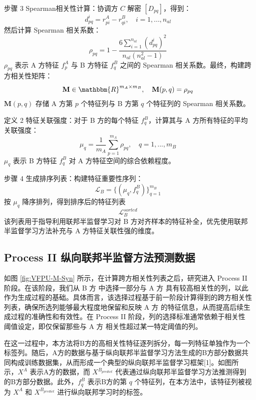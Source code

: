 步骤 3 Spearman相关性计算：协调方 $ C $ 解密 $ [D_{pq}] $，得到：
\begin{equation}
	d_{pq}^i = r^A_{pi} - r^B_{qi}, \quad i = 1, ..., n_{al}
\end{equation}
然后计算 Spearman 相关系数：
\begin{equation}
	\rho_{pq} = 1 - \frac{6\sum_{i=1}^{n_{al}} (d_{pq}^i)^2}{n_{al}(n_{al}^2 - 1)}
\end{equation}
$ \rho_{pq} $ 表示 A 方特征 $ f^A_p $ 与 B 方特征 $ f^B_q $ 之间的 Spearman 相关系数。最终，构建跨方相关性矩阵：
\begin{equation}
	\mathbf{M} \in \mathbbm{R}^{m_A \times m_B}, \quad \mathbf{M}(p,q) = \rho_{pq}
\end{equation}
$ \mathbf{M}(p,q) $ 存储 A 方第 $ p $ 个特征列与 B 方第 $ q $ 个特征列的 Spearman 相关系数。

定义 2 特征关联强度：对于 B 方的每个特征 $ f^B_q $，计算其与 A 方所有特征的平均关联强度：
\begin{equation}
	\mu_q = \frac{1}{m_A} \sum_{p=1}^{m_A} \rho_{pq}, \quad q=1,...,m_B
\end{equation}
$ \mu_q $ 表示 B 方特征 $ f^B_q $ 对 A 方特征空间的综合依赖程度。

步骤 4 生成排序列表：构建特征重要性序列：
\begin{equation}
	\mathcal{L}_B = \{(\mu_q, f^B_q)\}_{q=1}^{m_B}
\end{equation}
按 $ \mu_q $ 降序排列，得到排序后的特征列表
\begin{equation}
	\mathcal{L}_B^{sorted}
\end{equation}
该列表用于指导利用联邦半监督学习对 B 方对齐样本的特征补全，优先使用联邦半监督学习方法补充与 A 方特征关联性强的维度。
\subsection{Process II 纵向联邦半监督方法预测数据}
如图 \ref{fig:VFPU-M-Syn} 所示，在计算跨方相关性列表之后，研究进入 Process II 阶段。在该阶段，我们从 B 方 中选择一部分与 A 方 具有较高相关性的列，以此作为生成过程的基础。具体而言，该选择过程基于前一阶段计算得到的跨方相关性列表，确保所选列能够最大程度地保留和反映 A 方 的特征信息，从而提高后续生成过程的准确性和有效性。在 Process II 阶段，列的选择标准通常依赖于相关性阈值设定，即仅保留那些与 A 方 相关性超过某一特定阈值的列。

在这一过程中，本方法将B方的高相关性特征逐列拆分，每一列特征单独作为一个标签列。随后，A方的数据与基于纵向联邦半监督学习方法生成的B方部分数据共同构成训练数据集，从而形成一个典型的纵向联邦半监督学习框架[1]。如图所示，$X^A$ 表示A方的数据，而 ${{X}^{{{B}_{predict}}}}$ 代表通过纵向联邦半监督学习方法推测得到的B方部分数据。此外，$f_{q}^{B}$ 表示B方的第 $q$ 个特征列，在本方法中，该特征列被视为 $X^A$ 和 ${{X}^{{{B}_{predict}}}}$ 进行纵向联邦学习时的标签。

